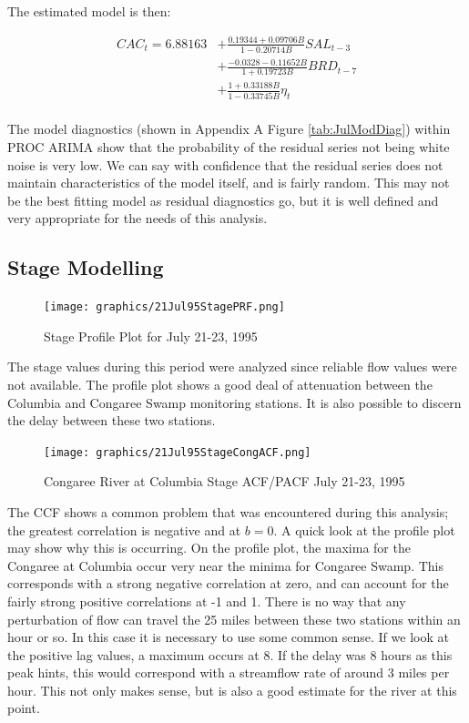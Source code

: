 \documentclass[12pt]{report}
\begin{document}
The estimated model is then:

\begin{equation}
\begin{split}
\label{eq:21julflowmodel} CAC_t=6.88163&+\frac{0.19344+0.09706
B}{1-0.20714B}SAL_{t-3}\\
&+\frac{-0.0328-0.11652B}{1+0.19723B}BRD_{t-7}\\
&+\frac{1+0.33188B}{1-0.33745B}\eta_t\\
\end{split}
\end{equation}

The model diagnostics (shown in Appendix A Figure
\ref{tab:JulModDiag}) within PROC ARIMA show that the probability
of the residual series not being white noise is very low.  We can
say with confidence that the residual series does not maintain
characteristics of the model itself, and is fairly random.  This
may not be the best fitting model as residual diagnostics go, but
it is well defined and very appropriate for the needs of this
analysis.

\clearpage
\subsection{Stage Modelling}

\begin{figure}[h]
\centering\texttt{[image: graphics/21Jul95StagePRF.png]}
\centering\caption{Stage Profile Plot for July 21-23, 1995}
\end{figure}

The stage values during this period were analyzed since reliable
flow values were not available.  The profile plot shows a good
deal of attenuation between the Columbia and Congaree Swamp
monitoring stations.  It is also possible to discern the delay
between these two stations.

\begin{figure}[h]
\centering\texttt{[image: graphics/21Jul95StageCongACF.png]}
\centering\caption{Congaree River at Columbia Stage ACF/PACF July
21-23, 1995}\label{fig:julsconapcf}
\end{figure}


The CCF shows a common problem that was encountered during this
analysis; the greatest correlation is negative and at $b=0$. A
quick look at the profile plot may show why this is occurring. On
the profile plot, the maxima for the Congaree at Columbia occur
very near the minima for Congaree Swamp.  This corresponds with a
strong negative correlation at zero, and can account for the
fairly strong positive correlations at -1 and 1. There is no way
that any perturbation of flow can travel the 25 miles between
these two stations within an hour or so.  In this case it is
necessary to use some common sense.  If we look at the positive
lag values, a maximum occurs at 8.  If the delay was 8 hours as
this peak hints, this would correspond with a streamflow rate of
around 3 miles per hour.  This not only makes sense, but is also a
good estimate for the river at this point.
\end{document}
